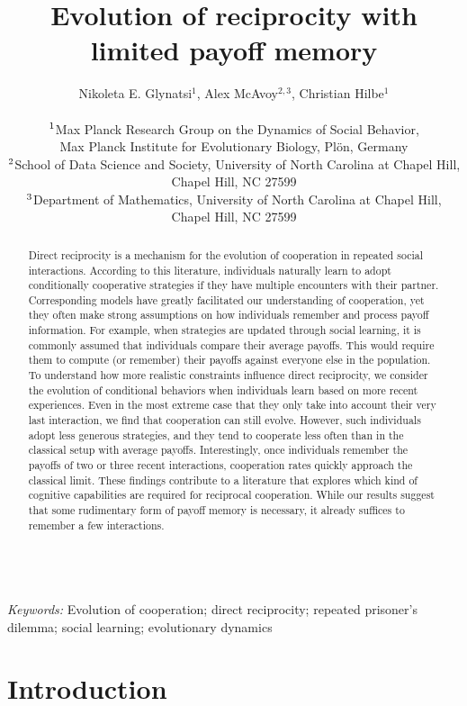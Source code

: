 \documentclass[11pt]{article}
\title{\bf  \sffamily \Large Evolution of reciprocity %
with limited payoff memory\\}
\date{}
\author{\parbox[c]{16cm}{\centering \onehalfspacing 
Nikoleta E. Glynatsi$^1$,  Alex McAvoy$^{2,3}$, Christian Hilbe$^1$\\ \quad \\
$^{\rm 1}$Max Planck Research Group on the Dynamics of Social Behavior,\\ Max Planck Institute for Evolutionary Biology, Pl\"{o}n, Germany \\
$^{\rm 2}$School of Data Science and Society, University of North Carolina at Chapel Hill,\\ Chapel Hill, NC 27599 \\
$^{\rm 3}$Department of Mathematics, University of North Carolina at Chapel Hill,\\ Chapel Hill, NC 27599}}
\theoremstyle{plainCl1}
\theoremstyle{plainCl2}
\begin{document}
\maketitle


\begin{abstract}
\noindent
Direct reciprocity is a mechanism for the evolution of cooperation in repeated social interactions. 
According to this literature, individuals naturally learn to adopt conditionally cooperative strategies if they have multiple encounters with their partner. 
Corresponding models have greatly facilitated our understanding of cooperation, yet they often make strong assumptions on how individuals remember and process payoff information. 
For example, when strategies are updated through social learning, it is commonly assumed that individuals compare their average payoffs.  
This would require them to compute (or remember) their payoffs against everyone else in the population.
To understand how more realistic constraints influence direct reciprocity, we consider the evolution of conditional behaviors when individuals learn based on more recent experiences.
Even in the most extreme case that they only take into account their very last interaction, we find that cooperation can still evolve. 
However, such individuals adopt less generous strategies, and they tend to cooperate less often than in the classical setup with average payoffs. 
Interestingly, once individuals remember the payoffs of two or three recent interactions, cooperation rates quickly approach the classical limit. 
These findings contribute to a literature that explores which kind of cognitive capabilities are required for reciprocal cooperation. 
While our results suggest that some rudimentary form of payoff memory is necessary, it already suffices to remember a few interactions.
\end{abstract}

~\\
{\it Keywords:} Evolution of cooperation; direct reciprocity; repeated prisoner's dilemma; social learning; evolutionary dynamics



\clearpage
\newpage



\section{Introduction}

\end{document}
